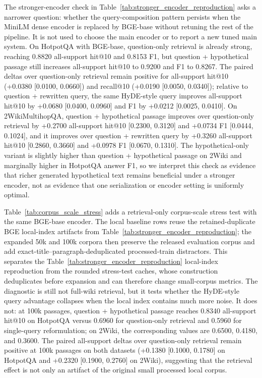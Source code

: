 The stronger-encoder check in Table~\ref{tab:stronger_encoder_reproduction} asks a narrower question: whether the query-composition pattern persists when the MiniLM dense encoder is replaced by BGE-base without retuning the rest of the pipeline. It is not used to choose the main encoder or to report a new tuned main system. On HotpotQA with BGE-base, question-only retrieval is already strong, reaching 0.8820 all-support hit@10 and 0.8153 F1, but question + hypothetical passage still increases all-support hit@10 to 0.9200 and F1 to 0.8267. The paired deltas over question-only retrieval remain positive for all-support hit@10 (+0.0380 [0.0100, 0.0660]) and recall@10 (+0.0190 [0.0050, 0.0340]); relative to question + rewritten query, the same HyDE-style query improves all-support hit@10 by +0.0680 [0.0400, 0.0960] and F1 by +0.0212 [0.0025, 0.0410]. On 2WikiMultihopQA, question + hypothetical passage improves over question-only retrieval by +0.2700 all-support hit@10 [0.2300, 0.3120] and +0.0734 F1 [0.0444, 0.1024], and it improves over question + rewritten query by +0.3260 all-support hit@10 [0.2860, 0.3660] and +0.0978 F1 [0.0670, 0.1310]. The hypothetical-only variant is slightly higher than question + hypothetical passage on 2Wiki and marginally higher in HotpotQA answer F1, so we interpret this check as evidence that richer generated hypothetical text remains beneficial under a stronger encoder, not as evidence that one serialization or encoder setting is uniformly optimal.

Table~\ref{tab:corpus_scale_stress} adds a retrieval-only corpus-scale stress test with the same BGE-base encoder. The local baseline rows reuse the retained-duplicate BGE local-index artifacts from Table~\ref{tab:stronger_encoder_reproduction}; the expanded 50k and 100k corpora then preserve the released evaluation corpus and add exact-title--paragraph-deduplicated processed-train distractors. This separates the Table~\ref{tab:stronger_encoder_reproduction} local-index reproduction from the rounded stress-test caches, whose construction deduplicates before expansion and can therefore change small-corpus metrics. The diagnostic is still not full-wiki retrieval, but it tests whether the HyDE-style query advantage collapses when the local index contains much more noise. It does not: at 100k passages, question + hypothetical passage reaches 0.8340 all-support hit@10 on HotpotQA versus 0.6960 for question-only retrieval and 0.5960 for single-query reformulation; on 2Wiki, the corresponding values are 0.6500, 0.4180, and 0.3600. The paired all-support deltas over question-only retrieval remain positive at 100k passages on both datasets (+0.1380 [0.1000, 0.1780] on HotpotQA and +0.2320 [0.1900, 0.2760] on 2Wiki), suggesting that the retrieval effect is not only an artifact of the original small processed local corpus.

